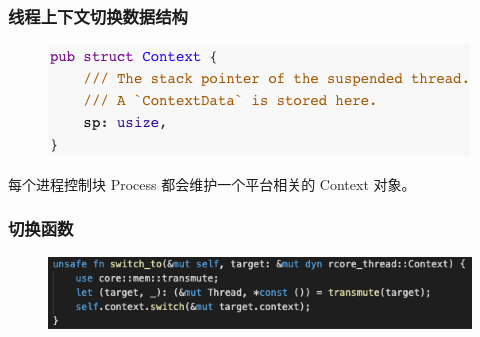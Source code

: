 % 
% 
% 

\begin{frame}[fragile]
    \frametitle{线程上下文切换数据结构}
    \begin{figure}
    \includegraphics[width=0.7\linewidth]{figs/struct-Context.png}
    \end{figure}

每个进程控制块 Process 都会维护一个平台相关的 Context 对象。

\end{frame}

% 
% 
% 
\begin{frame}[fragile]
    \frametitle{切换函数}
    \begin{figure}
    \includegraphics[width=0.9\linewidth]{figs/switch-to.png}
    \end{figure}
\end{frame}


